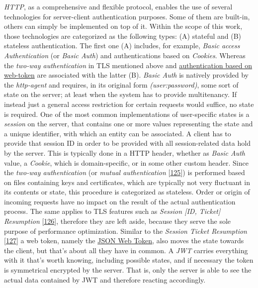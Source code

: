 \documentclass[12pt,english,a4paper,titlepage,cleardoublepage=empty,dottedtoc]{report}
\begin{document}
\emph{HTTP}, as a comprehensive and flexible protocol, enables the use
of several technologies for server-client authentication purposes. Some
of them are built-in, others can simply be implemented on top of it.
Within the scope of this work, those technologies are categorized as the
following types: (A) stateful and (B) stateless authentication. The
first one (A) includes, for example, \emph{Basic access Authentication}
(or \emph{Basic Auth}) and authentications based on \emph{Cookies}.
Whereas the \emph{two-way authentication} in TLS mentioned above and
\protect\hyperlink{def--jwt}{authentication based on web-token} are
associated with the latter (B). \emph{Basic Auth} is natively provided
by the \emph{http-agent} and requires, in its original form
\emph{(user:password)}, some sort of state on the server; at least when
the system has to provide multitenancy. If instead just a general access
restriction for certain requests would suffice, no state is required.
One of the most common implementations of user-specific states is a
\emph{session} on the server, that contains one or more values
representing the state and a unique identifier, with which an entity can
be associated. A client has to provide that session ID in order to be
provided with all session-related data hold by the server. This is
typically done in a HTTP header, whether as \emph{Basic Auth} value, a
\emph{Cookie}, which is domain-specific, or in some other custom header.
Since the \emph{two-way authentication} (or \emph{mutual authentication}
{[}\protect\hyperlink{ref-web_2017_wikipedia_mutual-auth}{125}{]}) is
performed based on files containing keys and certificates, which are
typically not very fluctuant in its contents or state, this procedure is
categorized as stateless. Order or origin of incoming requests have no
impact on the result of the actual authentication process. The same
applies to TLS features such as \emph{Session {[}ID, Ticket{]}
Resumption}
{[}\protect\hyperlink{ref-book_2013_networking-101_tls-session-resumption}{126}{]},
therefore they are left aside, because they serve the sole purpose of
performance optimization. Similar to the \emph{Session Ticket
Resumption}
{[}\protect\hyperlink{ref-web_spec_tls-session-ticket-resumption}{127}{]}
a web token, namely the \protect\hyperlink{def--jwt}{JSON Web Token},
also moves the state towards the client, but that's about all they have
in common. A \emph{JWT} carries everything with it that's worth knowing,
including possible states, and if necessary the token is symmetrical
encrypted by the server. That is, only the server is able to see the
actual data contained by JWT and therefore reacting accordingly.
\end{document}
